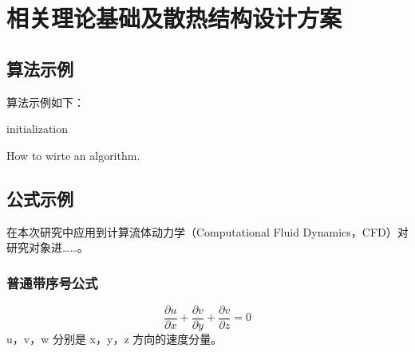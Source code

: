 \chapter{相关理论基础及散热结构设计方案}\label{ch:2}

\section{算法示例}

\noindent 算法示例如下：

\begin{algorithm}[H]
    initialization\;
    \caption{How to wirte an algorithm.}
\end{algorithm}




\section{公式示例}
在本次研究中应用到计算流体动力学（Computational Fluid Dynamics，CFD）对研究对象进……。


\subsection{普通带序号公式}
\begin{equation}
    \frac{\partial u}{\partial x}+\frac{\partial v}{\partial y}+\frac{\partial v}{\partial z}=0
\end{equation}
u，v，w 分别是 x，y，z 方向的速度分量。


